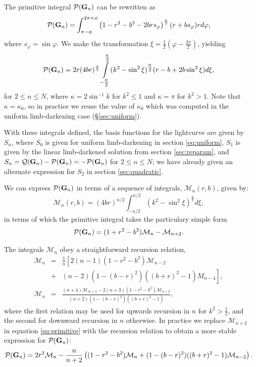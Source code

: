 \documentclass[modern]{aastex61}
\begin{document}
The primitive integral
$\mathcal{P}({\mathbf{G}}_n)$ can be rewritten as
\begin{equation}
\mathcal{P}(\bvec{G}_n) =
\int_{\pi-\phi}^{2\pi + \phi} \left(1-r^2-b^2-2br s_\varphi\right)^{\frac{n}{2}} (r+b s_\varphi) r d\varphi,
\end{equation}
where $s_\varphi = \sin{\varphi}$.
We make the transformation $\xi = \tfrac{1}{2} \left(\varphi - \tfrac{3\pi}{2}\right)$, yielding
\begin{equation}
\mathcal{P}(\bvec{G}_n) =
2r (4br)^{\frac{n}{2}}\int\displaylimits_{-\tfrac{\kappa}{2}}^{\tfrac{\kappa}{2}}
(k^2-\sin^2\xi)^{\tfrac{n}{2}} (r-b + 2b \sin^2 \xi) d\xi,
\end{equation}
for $2 \le n \le N$, where $\kappa = 2 \sin^{-1}k$ for $k^2 \le 1$ and
$\kappa = \pi$ for $k^2 > 1$.  Note that $\kappa = \kappa_0$, so in practice we
reuse the value of $\kappa_0$ which was computed in the uniform limb-darkening
case (\S \ref{sec:uniform}).

With these integrals defined, the basis functions for the lightcurve are given
by $S_n$, where $S_0$ is given for uniform limb-darkening
in section \ref{eq:uniform}, $S_1$ is given by the linear limb-darkened
solution from section \ref{sec:reparam}, and  $S_n = \mathcal{Q}({\mathbf{G}}_n)
- \mathcal{P}({\mathbf{G}}_n) = -\mathcal{P}({\mathbf{G}}_n)$ for $2 \le n \le N$;
we have already given an alternate expression for $S_2$ in section \ref{sec:quadratic}.

We can express $\mathcal{P}({\mathbf{G}}_n)$ in terms of a sequence of integrals,
$\mathcal{M}_n(r,b)$, given by:
\begin{equation}
\mathcal{M}_n(r,b) = (4br)^{n/2} \int_{-\kappa/2}^{\kappa/2} (k^2-\sin^2\xi)^{\tfrac{n}{2}} d\xi,
\end{equation}
in terms of which the primitive integral takes the particulary simple form
\begin{equation}\label{eq:primitive}
\mathcal{P}(\bvec{G}_n) = (1+r^2-b^2)\mathcal{M}_n - \mathcal{M}_{n+2}.
\end{equation}

The integrals $\mathcal{M}_n$ obey a straightforward recursion relation,
\begin{eqnarray}
\mathcal{M}_n &=& \frac{1}{n} \left[ 2(n-1) (1-r^2-b^2) \mathcal{M}_{n-2} \right.\\ 
  &+& \left. (n-2) (1-(b-r)^2)((b+r)^2-1) M_{n-4}\right],\\
\mathcal{M}_n &=& \frac{(n+4)\mathcal{M}_{m+4} - 2(n+3)(1-r^2-b^2)\mathcal{M}_{n+2}}{(n+2)(1-(b-r)^2)((b+r)^2-1)},
\end{eqnarray}
where the first relation may be used for upwards recursion in $n$ for $k^2 > \frac{1}{2}$, 
and the second for downward recursion in $n$ otherwise.
In practice we replace $\mathcal{M}_{n+2}$ in equation \ref{eq:primitive} with 
the recursion relation to obtain a more stable expression for $\mathcal{P}({\mathbf{G}}_n)$:
\begin{equation}
\mathcal{P}(\bvec{G}_n) = 2r^2 \mathcal{M}_n - \frac{n}{n+2}\left((1-r^2-b^2)\mathcal{M}_n+(1-(b-r)^2)((b+r)^2-1)\mathcal{M}_{n-2}\right).
\end{equation}
\end{document}
